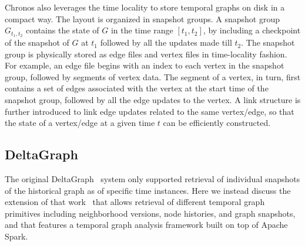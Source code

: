 \documentclass{svjour3}
\begin{document}
\vspace{2mm}

 Chronos also leverages the time locality to store temporal graphs on disk in a compact way. The layout is organized in snapshot groups. A snapshot group $G_{t_1,t_2}$ contains the state of $G$ in the time range $[t_1,t_2]$, by including a checkpoint of the snapshot of $G$ at $t_1$ followed by all the updates made till $t_2$. The snapshot group is physically stored as edge files and vertex files in time-locality fashion. For example, an edge file begins with an index to each vertex in the snapshot group, followed by segments of vertex data. The segment of a vertex, in turn, first contains a set of edges associated with the vertex at the start time of the snapshot group, followed by all the edge updates to the vertex. A link structure is further introduced to link edge updates related to the same vertex/edge, so that the state of a vertex/edge at a given time $t$ can be efficiently constructed.

\subsection{DeltaGraph}
The original DeltaGraph~\cite{KhuranaD13:HistoricGraph} system only supported retrieval of individual snapshots of the historical graph as of specific time instances. Here we instead discuss the extension of that work~\cite{KhuranaD16:HistoricGraph} that allows retrieval of different temporal graph primitives including neighborhood versions, node histories, and graph snapshots, and that features a temporal graph analysis framework built on top of Apache Spark. 
\end{document}
